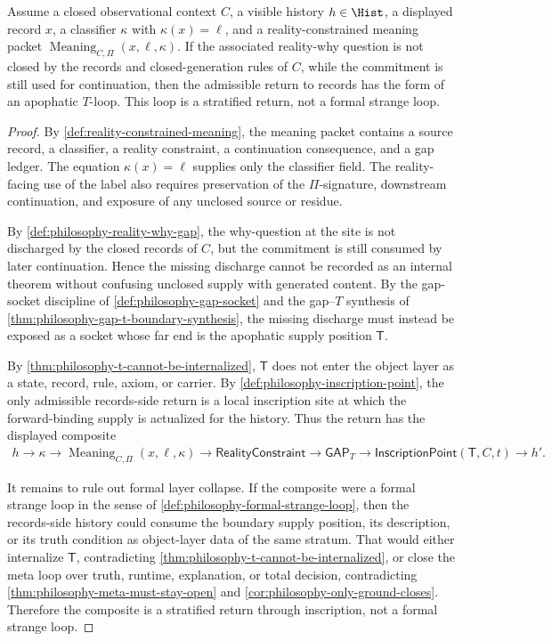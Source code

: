 \begin{theorem}
\label{thm:philosophy-apophatic-t-loop}
Assume a closed observational context $C$, a visible history
$h\in\Hist$, a displayed record $x$, a classifier $\kappa$ with
$\kappa(x)=\ell$, and a reality-constrained meaning packet
$\operatorname{Meaning}_{C,\Pi}(x,\ell,\kappa)$. If the associated
reality-why question is not closed by the records and closed-generation
rules of $C$, while the commitment is still used for continuation, then
the admissible return to records has the form of an apophatic $T$-loop.
This loop is a stratified return, not a formal strange loop.
\end{theorem}
\begin{proof}
By \autoref{def:reality-constrained-meaning}, the meaning packet
contains a source record, a classifier, a reality constraint, a
continuation consequence, and a gap ledger. The equation
$\kappa(x)=\ell$ supplies only the classifier field. The reality-facing
use of the label also requires preservation of the $\Pi$-signature,
downstream continuation, and exposure of any unclosed source or residue.

By \autoref{def:philosophy-reality-why-gap}, the why-question at the
site is not discharged by the closed records of $C$, but the
commitment is still consumed by later continuation. Hence the missing
discharge cannot be recorded as an internal theorem without confusing
unclosed supply with generated content. By the gap-socket discipline of
\autoref{def:philosophy-gap-socket} and the gap--$T$ synthesis of
\autoref{thm:philosophy-gap-t-boundary-synthesis}, the missing
discharge must instead be exposed as a socket whose far end is the
apophatic supply position $\mathsf{T}$.

By \autoref{thm:philosophy-t-cannot-be-internalized}, $\mathsf{T}$ does
not enter the object layer as a state, record, rule, axiom, or carrier.
By \autoref{def:philosophy-inscription-point}, the only admissible
records-side return is a local inscription site at which the
forward-binding supply is actualized for the history. Thus the return
has the displayed composite
$$
\begin{gathered}
h
\longrightarrow
\kappa
\longrightarrow
\operatorname{Meaning}_{C,\Pi}(x,\ell,\kappa)
\longrightarrow
\mathsf{RealityConstraint}
\longrightarrow
\mathsf{GAP}_{T}
\longrightarrow
\mathsf{InscriptionPoint}(\mathsf{T},C,t)
\longrightarrow
h'.
\end{gathered}
$$

It remains to rule out formal layer collapse. If the composite were a
formal strange loop in the sense of
\autoref{def:philosophy-formal-strange-loop}, then the records-side
history could consume the boundary supply position, its description,
or its truth condition as object-layer data of the same stratum. That
would either internalize $\mathsf{T}$, contradicting
\autoref{thm:philosophy-t-cannot-be-internalized}, or close the meta
loop over truth, runtime, explanation, or total decision, contradicting
\autoref{thm:philosophy-meta-must-stay-open} and
\autoref{cor:philosophy-only-ground-closes}. Therefore the composite
is a stratified return through inscription, not a formal strange loop.
\end{proof}

